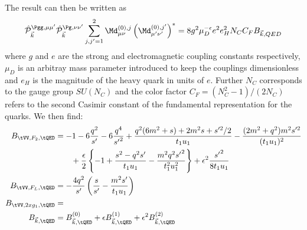 The result can then be written as
\begin{equation}
\hat {\mathcal P}_{\vec k}^{\Pgg,\mu\mu'}\hat {\mathcal P}_{\vec k}^{\Pg,\nu\nu'}\sum_{j,j'=1}^2\Md^{(0),j}_{\mu\nu}\left(\Md^{(0),j'}_{\mu'\nu'}\right)^* = 8g^2\mu_D^{-\epsilon}e^2e_H^2 N_C C_F B_{\vec k,QED}
\end{equation}
where $g$ and $e$ are the strong and electromagnetic coupling constants respectively, $\mu_D$ is an arbitray mass parameter introduced to keep the couplings dimensionless and $e_H$ is the magnitude of the heavy quark in units of $e$. Further $N_C$ corresponds to the gauge group $SU(N_C)$ and the color factor $C_F=(N_C^2-1)/(2N_C)$ refers to the second Casimir constant of the fundamental representation for the quarks. We then find:
\begin{align}
B_{\tVV,F_2,\tQED} &= -1 - 6\frac{q^2}{s'} - 6\frac{q^4}{{s'}^2} + \frac{q^2(6m^2+s) +2m^2 s + s'^2/2}{t_1u_1} - \frac{(2m^2+q^2)m^2s'^2}{(t_1 u_1)^2}\nonumber\\
 &\hspace{20pt}+\frac{\epsilon}{2}\left\{ -1 + \frac{s^2-q^2s'}{t_1u_1} - \frac{m^2q^2{s'}^2}{t_1^2u_1^2} \right\} + \epsilon^2\frac{{s'}^2}{8t_1u_1}\\
B_{\tVV,F_L,\tQED} &= -\frac{4q^2}{s'}\left(\frac s {s'} - \frac{m^2s'}{t_1u_1}\right)\\
B_{\tVV,2xg_1,\tQED} &= \\
B_{\vec k,\tQED} &= B^{(0)}_{\vec k,\tQED} + \epsilon B^{(1)}_{\vec k,\tQED} + \epsilon^2 B^{(2)}_{\vec k,\tQED}
\end{align}


